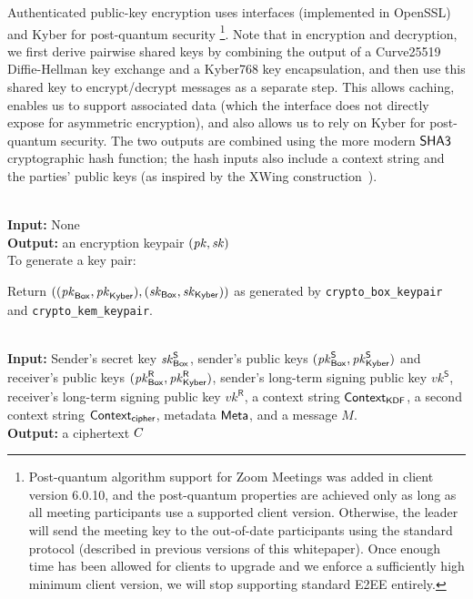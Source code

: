 Authenticated public-key encryption uses \sodium{} interfaces (implemented in OpenSSL) and Kyber for
post-quantum security%
%
\footnote{Post-quantum algorithm support for Zoom Meetings was added in client version 6.0.10, and
the post-quantum properties are achieved only as long as all meeting participants use a supported
client version. Otherwise, the leader will send the meeting key to the out-of-date participants
using the standard protocol (described in previous versions of this whitepaper). Once enough time
has been allowed for clients to upgrade and we enforce a sufficiently high minimum client version,
we will stop supporting standard E2EE entirely.}.
%
Note that in encryption and decryption, we first derive pairwise shared keys by combining the output
of a Curve25519 Diffie-Hellman key exchange and a Kyber768 key encapsulation, and then use this
shared key to encrypt/decrypt messages as a separate step. This allows caching, enables us to
support associated data (which the \sodium{} interface does not directly expose for asymmetric
encryption), and also allows us to rely on Kyber for post-quantum security. The two outputs are
combined using the more modern ${\sf SHA3}$ cryptographic hash function; the hash inputs also include
a context string and the parties' public keys (as inspired by the XWing construction~\cite{xwing}).


{\underline {\bf \cboxkeygen}}\\
{\bf Input:} None \\
{\bf Output:} an encryption keypair $(\mathit{pk},\mathit{sk})$ \\

To generate a key pair:

\vspace{-1.5em}
\begingroup
\RaggedRight
\begin{enumerate*}
\item Return $((\mathit{pk}_{{\sf Box}}, \mathit{pk}_{{\sf Kyber}}), (\mathit{sk}_{{\sf Box}},  \mathit{sk}_{{\sf Kyber}}))$ as generated by \texttt{crypto\_box\_keypair} and \texttt{crypto\_kem\_keypair}.
\end{enumerate*}
\endgroup


{\underline {\bf \cboxencrypt}} \\
{\bf Input:} Sender's secret key $\mathit{sk}_{{\sf Box}}^{\sf S}$, sender's public keys $(\mathit{pk}_{{\sf Box}}^{\sf S}, \mathit{pk}_{{\sf Kyber}}^{\sf S})$ and receiver's public keys $(\mathit{pk}_{{\sf Box}}^{\sf R}, \mathit{pk}_{{\sf Kyber}}^{\sf R})$, sender's long-term signing public key $vk^\textsf{S}$, receiver's long-term signing public key $vk^\textsf{R}$, a context string
${\sf Context}_\textsf{KDF}$, a second context string ${\sf Context}_\textsf{cipher}$, metadata ${\sf Meta}$,
and a message $M$. \\
{\bf Output:} a ciphertext $C$ \\

